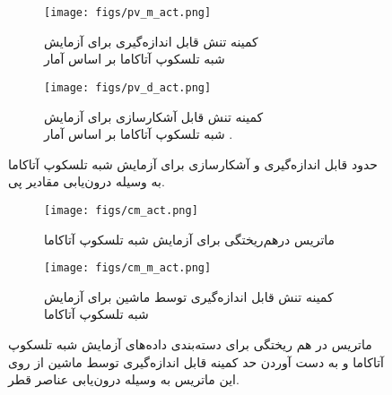   	\begin{figure}
  		\centering
  		\begin{subfigure}{0.5\textwidth}
  			\centering
  			\texttt{[image: figs/pv\_m\_act.png]}
  			\caption{   کمینه تنش قابل اندازه‌گیری برای آزمایش  
  				\\	شبه تلسکوپ آتاکاما
  				بر اساس آمار  }
  		\end{subfigure}%
  		\begin{subfigure}{0.5\textwidth}
  			\centering
  			\texttt{[image: figs/pv\_d\_act.png]}
  			\caption{  کمینه تنش قابل آشکارسازی برای آزمایش 
  				\\ شبه تلسکوپ آتاکاما
  				بر اساس آمار 
  				. }
  		\end{subfigure}
  		
  		\caption{حدود قابل اندازه‌گیری و آشکارسازی برای آزمایش 
شبه تلسکوپ آتاکاما به وسیله درون‌یابی مقادیر پی.}
  		\label{fig:act_pv}
  	\end{figure}
  	\begin{figure}
  		\centering
  		\begin{subfigure}{\textwidth}
  			\centering
  			\texttt{[image: figs/cm\_act.png]}
  			\caption{  ماتریس درهم‌ریختگی برای آزمایش شبه تلسکوپ آتاکاما }
  		\end{subfigure}%
  		
  		\begin{subfigure}{0.5\linewidth}
  			\centering
  			\texttt{[image: figs/cm\_m\_act.png]}
  			\caption{  کمینه تنش قابل اندازه‌گیری توسط ماشین برای آزمایش شبه تلسکوپ آتاکاما }
  		\end{subfigure}
  		
  		\caption{ماتریس در هم ریختگی برای دسته‌بندی داده‌های آزمایش شبه تلسکوپ آتاکاما
  			و به دست آوردن حد کمینه قابل اندازه‌گیری توسط ماشین از روی این ماتریس به وسیله درون‌یابی عناصر قطر.}
  		\label{fig:act_cm}
  	\end{figure}
  	
  	
  	
